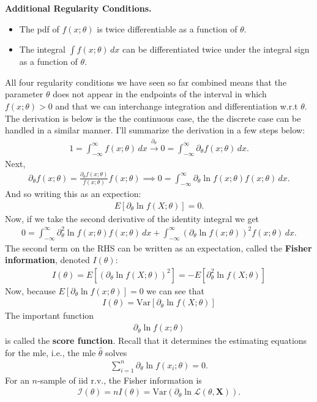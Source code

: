 \documentclass{book}
\theoremstyle{definition}
\newcommand{\p}{\partial}
\newcommand{\lag}{\mathcal{L}}
\newcommand{\f}[2]{\frac{#1}{#2}}
\newcommand{\lp}{\left(}
\newcommand{\rp}{\right)}
\newcommand{\lb}{\left[}
\newcommand{\rb}{\right]}
\begin{document}
\noindent \textbf{Additional Regularity Conditions.} 
\begin{itemize}
	\item The pdf of $f(x;\theta)$ is twice differentiable as a function of $\theta$.
	\item The integral $\int f(x;\theta)\,dx$ can be differentiated twice under the integral sign as a function of $\theta$.
\end{itemize}


All four regularity conditions we have seen so far combined means that the parameter $\theta$ does not appear in the endpoints of the interval in which $f(x;\theta) > 0$ and that we can interchange integration and differentiation w.r.t $\theta$. The derivation is below is the the continuous case, the the discrete case can be handled in a similar manner. I'll summarize the derivation in a few steps below:
\begin{align}
1 = \int^\infty_{-\infty} f(x;\theta)\,dx \xrightarrow{\p_\theta} 0  = \int^\infty_{-\infty} \p_\theta f(x;\theta)\,dx.  
\end{align}
Next, 
\begin{align}
\p_\theta f(x;\theta) = \f{\p_\theta f(x;\theta)}{f(x;\theta)} f(x;\theta) \implies 0 = \int^\infty_{-\infty} {\p_\theta \ln f(x;\theta)} f(x;\theta)\,dx.
\end{align}
And so writing this as an expection:
\begin{align}
E\lb {\p_\theta \ln f(X;\theta)} \rb = 0. 
\end{align}
Now, if we take the second derivative of the identity integral we get
\begin{align}
0 = \int^\infty_{-\infty} \p^2_\theta \ln f(x;\theta)f(x;\theta)\,dx + \int^\infty_{-\infty} \lp \p_\theta \ln f(x;\theta) \rp^2 f(x;\theta)\,dx.
\end{align}
The second term on the RHS can be written as an expectation, called the \textbf{Fisher information}, denoted $I(\theta)$:
\begin{align}
\boxed{ I(\theta) = E\lb \lp \p_\theta \ln f(X;\theta) \rp^2 \rb = -E\lb \p_\theta^2 \ln f(X;\theta)  \rb}
\end{align}
Now, because $E\lb {\p_\theta \ln f(x;\theta)} \rb = 0$ we can see that 
\begin{align}
\boxed{I(\theta) = \text{Var}\lb \p_\theta \ln f(X;\theta) \rb}
\end{align}
The important function 
\begin{align}
\p_\theta \ln f(x;\theta)
\end{align}
is called the \textbf{score function}. Recall that it determines the estimating equations for the mle, i.e., the mle $\hat\theta$ solves
\begin{align}
\sum^n_{i=1} \p_\theta \ln f(x_i;\theta) = 0.
\end{align}
For an $n$-sample of iid r.v., the Fisher information is 
\begin{align}
\mathcal{I}(\theta) = nI(\theta) = \text{Var}\lp \p_\theta \ln \lag (\theta,\mathbf{X}) \rp.
\end{align}
\end{document}
